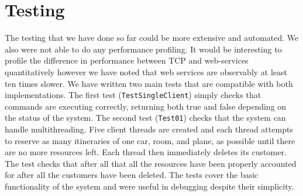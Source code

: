 \documentclass{article}
\begin{document}
\section{Testing}

The testing that we have done so far could be more extensive and automated. We also were not able to do any performance profiling. It would be interesting to profile the difference in performance between TCP and web-services quantitatively however we have noted that web services are observably at least ten times slower. We have written two main tests that are compatible with both implementations. The first test (\texttt{TestSingleClient}) simply checks that commands are executing correctly, returning both true and false depending on the status of the system. The second test (\texttt{Test01}) checks that the system can handle multithreading. Five client threads are created and each thread attempts to reserve as many itineraries of one car, room, and plane, as possible until there are no more resources left. Each thread then immediately deletes its customer. The test checks that after all that all the resources have been properly accounted for after all the customers have been deleted. The tests cover the basic functionality of the system and were useful in debugging despite their simplicity.
\end{document}
